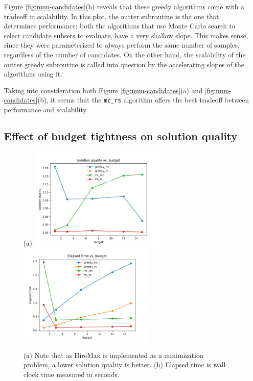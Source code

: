 Figure \ref{fig:num-candidates}(b) reveals that these greedy algorithms come with a tradeoff in scalability.
In this plot, the outter subroutine is the one that determines performance: both the algorithms that use Monte Carlo search to select candidate subsets to evaluate, have a very shallow slope.
This makes sense, since they were parameterized to always perform the same number of samples, regardless of the number of candidates.
On the other hand, the scalability of the outter greedy subroutine is called into question by the accelerating slopes of the algorithms using it.

Taking into consideration both Figure \ref{fig:num-candidates}(a) and \ref{fig:num-candidates}(b), it seems that the \texttt{mc\_rs} algorithm offers the best tradeoff between performance and scalability.

\subsection{Effect of budget tightness on solution quality}

\begin{figure}[h!]
	\centering
	(a) 	\includegraphics[width=0.6\textwidth]{figs/budget_results_multi_ground_set_plot.png}
	\includegraphics[width=0.6\textwidth]{figs/budget_results_multi_ground_set_time_plot.png}
	\caption{(a) Note that as HireMax is implemented as a minimization problem, a lower solution quality is better. (b) Elapsed time is wall clock time measured in seconds.}
	\label{fig:budget}
\end{figure}


